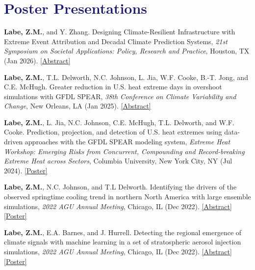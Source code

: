 \documentclass[margin,line,palatino,courier,10pt]{res}
\begin{document}
\begin{resume}
\begin{etaremune}[leftmargin=0in,topsep=0in,parsep=0in]
\end{etaremune}

\section{\sc \textcolor{MidnightBlue}{\large{\textbf{Poster Presentations}}}}
\begin{etaremune}[leftmargin=0in,topsep=0in,parsep=0in]
\item \textbf{Labe, Z.M.}, and Y. Zhang. Designing Climate-Resilient Infrastructure with Extreme Event Attribution and Decadal Climate Prediction Systems, \textit{21st Symposium on Societal Applications: Policy, Research and Practice}, Houston, TX (Jan 2026). \href{https://ams.confex.com/ams/106ANNUAL/meetingapp.cgi/Paper/470992}{[Abstract]}
\item \textbf{Labe, Z.M.}, T.L. Delworth, N.C. Johnson, L. Jia, W.F. Cooke, B.-T. Jong, and C.E. McHugh. Greater reduction in U.S. heat extreme days in overshoot simulations with GFDL SPEAR, \textit{38th Conference on Climate Variability and Change}, New Orleans, LA (Jan 2025). \href{https://ams.confex.com/ams/105ANNUAL/meetingapp.cgi/Paper/451978}{[Abstract]}
\item \textbf{Labe, Z.M.}, L. Jia, N.C. Johnson, C.E. McHugh, T.L. Delworth, and W.F. Cooke. Prediction, projection, and detection of U.S. heat extremes using data-driven approaches with the GFDL SPEAR modeling system, \textit{Extreme Heat Workshop: Emerging Risks from Concurrent, Compounding and Record-breaking Extreme Heat across Sectors}, Columbia University, New York City, NY (Jul 2024). \href{https://zacklabe.com/wp-content/uploads/2024/07/zlabe_heatwaveworkshop_poster_2024_final.pdf}{[Poster]}
\item \textbf{Labe, Z.M.}, N.C. Johnson, and T.L Delworth. Identifying the drivers of the observed springtime cooling trend in northern North America with large ensemble simulations, \textit{2022 AGU Annual Meeting}, Chicago, IL (Dec 2022). \href{https://agu.confex.com/agu/fm22/meetingapp.cgi/Paper/1111909}{[Abstract]} \href{https://zacklabe.files.wordpress.com/2022/12/labejohnsondelworth_agu_largeensembles2022_poster.pdf}{[Poster]}
\item \textbf{Labe, Z.M.}, E.A. Barnes, and J. Hurrell. Detecting the regional emergence of climate signals with machine learning in a set of stratospheric aerosol injection simulations, \textit{2022 AGU Annual Meeting}, Chicago, IL (Dec 2022). \href{https://agu.confex.com/agu/fm22/meetingapp.cgi/Paper/1110391}{[Abstract]} \href{https://zacklabe.files.wordpress.com/2022/12/labebarneshurrell_agu_sai2022_poster.pdf}{[Poster]}

\end{etaremune}
\end{resume}
\end{document}

